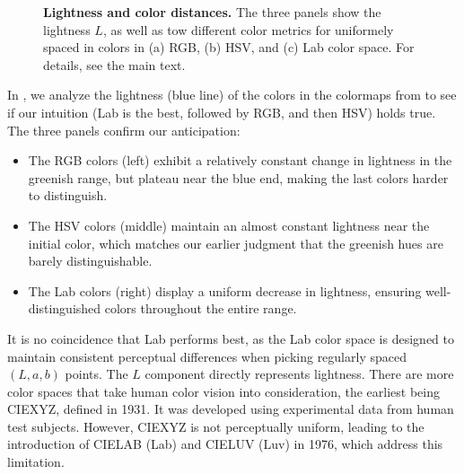 \begin{figure}
	\centering
	
	\caption{\textbf{Lightness and color distances.} The three panels show the lightness $L$, as well as tow different color metrics for uniformely spaced in colors in (a) RGB, (b) HSV, and (c) Lab color space. For details, see the main text.}
	\label{fig:colordiffs}
\end{figure}

In , we analyze the lightness (blue line) of the colors in the colormaps from  to see if our intuition (Lab is the best, followed by RGB, and then HSV) holds true.
The three panels confirm our anticipation:
\begin{itemize}
\item The RGB colors (left) exhibit a relatively constant change in lightness in the greenish range, but plateau near the blue end, making the last colors harder to distinguish.
\item The HSV colors (middle) maintain an almost constant lightness near the initial color, which matches our earlier judgment that the greenish hues are barely distinguishable.
\item The Lab colors (right) display a uniform decrease in lightness, ensuring well-distinguished colors throughout the entire range.
\end{itemize}

It is no coincidence that Lab performs best, as the Lab color space is designed to maintain consistent perceptual differences when picking regularly spaced $(L,a,b)$ points. The $L$ component directly represents lightness. There are more color spaces that take human color vision into consideration, the earliest being CIEXYZ, defined in 1931. It was developed using experimental data from human test subjects. However, CIEXYZ is not perceptually uniform, leading to the introduction of CIELAB (Lab) and CIELUV (Luv) in 1976, which address this limitation.

